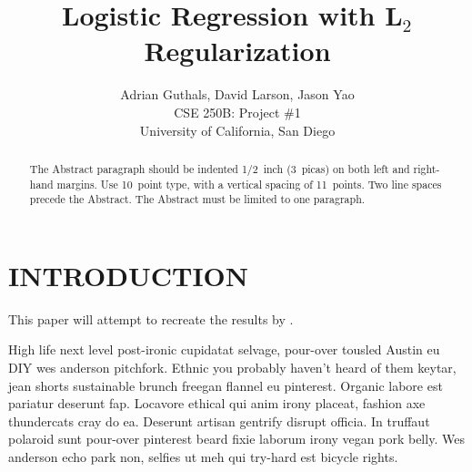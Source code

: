 
\title{Logistic Regression with L$_2$ Regularization}

\author{Adrian Guthals, David Larson, Jason Yao \\
CSE 250B: Project \#1 \\
University of California, San Diego \\
}




\maketitle


\begin{abstract}
The Abstract paragraph should be indented 1/2~inch (3~picas) on
both left and right-hand margins. Use 10~point type, with a
vertical spacing of 11~points. Two line spaces precede the Abstract.
The Abstract must be limited to one paragraph.
\end{abstract}





\section{INTRODUCTION}
\label{sec:intro}

This paper will attempt to recreate the results by \cite{t-logistic}.

High life next level post-ironic cupidatat selvage, pour-over tousled Austin eu DIY wes anderson pitchfork. Ethnic you probably haven't heard of them keytar, jean shorts sustainable brunch freegan flannel eu pinterest. Organic labore est pariatur deserunt fap. Locavore ethical qui anim irony placeat, fashion axe thundercats cray do ea. Deserunt artisan gentrify disrupt officia. In truffaut polaroid sunt pour-over pinterest beard fixie laborum irony vegan pork belly. Wes anderson echo park non, selfies ut meh qui try-hard est bicycle rights.




